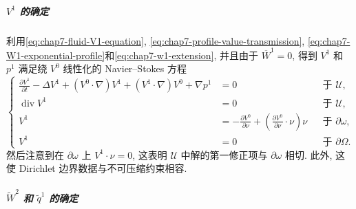 \begin{sloppypar}
\subparagraph{$V^1$ 的确定}

利用\eqref{eq:chap7-fluid-V1-equation}, \eqref{eq:chap7-profile-value-transmission}, \eqref{eq:chap7-W1-exponential-profile}和\eqref{eq:chap7-w1-extension}, 并且由于 $\overline W^1=0$, 得到 $V^1$ 和 $p^1$ 满足绕 $V^0$ 线性化的 Navier--Stokes 方程
\[
\left\{
\begin{aligned}
 \frac{\partial V^1}{\partial t}-\Delta V^1+(V^0\cdot\nabla)V^1
 +(V^1\cdot\nabla)V^0+\nabla p^1&=0&&\text{于 }\mathcal U,\\
 \operatorname{div}V^1&=0&&\text{于 }\mathcal U,\\
 V^1&=-\frac{\partial V^0}{\partial\nu}
 +\left(\frac{\partial V^0}{\partial\nu}\cdot\nu\right)\nu
 &&\text{于 }\partial\omega,\\
 V^1&=0&&\text{于 }\partial\Omega.
\end{aligned}
\right.
\]
然后注意到在 $\partial\omega$ 上 $V^1\cdot\nu=0$, 这表明 $\mathcal U$ 中解的第一修正项与 $\partial\omega$ 相切. 此外, 这使 Dirichlet 边界数据与不可压缩约束相容.

\subparagraph{$\widetilde W^2$ 和 $\widetilde q^1$ 的确定}


\end{sloppypar}
